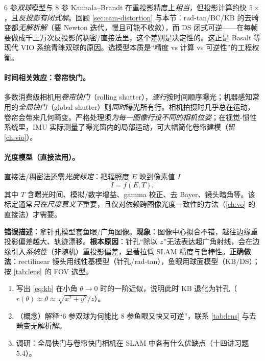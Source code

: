 \begin{insight}[现代实现为何偏爱双球]
$6$ 参\emph{双球}模型与 $8$ 参 Kannala--Brandt 在重投影精度上\emph{相当}，但投影计算约快 $5\times$，且\emph{反投影有闭式解}\cite{carlone2026handbook}。回顾 \cref{sec:cam-distortion} 与本节：rad-tan/BC/KB 的去畸变都\emph{无解析解}（要 Newton 迭代，慢且可能不收敛），而 DS 闭式可逆——在每帧要做成千上万次反投影的稠密/直接法里，这个差别是决定性的。这正是 Basalt 等现代 VIO 系统青睐双球的原因。选模型本质是“精度 vs 计算 vs 可逆性”的工程权衡。
\end{insight}

\paragraph{时间相关效应：卷帘快门。}
多数消费级相机用\emph{卷帘快门}（rolling shutter），\emph{逐行}按时间顺序曝光\cite{carlone2026handbook}；机器感知常用的\emph{全局快门}（global shutter）则\emph{同时}曝光所有行。相机拍摄时几乎总在运动，卷帘会带来几何畸变。严格处理须\emph{为每一图像行设不同的相机位姿}；在视觉-惯性系统里，IMU 实际测量了曝光窗内的局部运动，可大幅简化卷帘建模（留 \cref{ch:vio}）。

\paragraph{光度模型（直接法用）。}
直接法/稠密法还需\emph{光度标定}\cite{carlone2026handbook}：把辐照度 $E$ 映到像素值 $I$
\begin{equation}
  I=f(E,T),
  \label{eq:photometric}
\end{equation}
其中 $T$ 含曝光时间、模拟/数字增益、gamma 校正、去 Bayer、镜头暗角等。该标定通常\emph{只在尺度意义下}重要，且仅对依赖跨图像光度一致性的方法（\cref{ch:vo} 的直接法）才需要。

\begin{pitfall}[用错相机模型 $=$ 系统性偏差]
\textbf{错误描述}：拿针孔模型套鱼眼/广角图像。\textbf{现象}：图像中心拟合不错，越往边缘重投影偏差越大、轨迹漂移。\textbf{根本原因}：针孔“除以 $z$”无法表达超广角射线，会在边缘引入\emph{系统性}（非随机）重投影偏差，显著拉低 SLAM 精度与鲁棒性\cite{carlone2026handbook}。\textbf{正确做法}：rectilinear 镜头用线性基模型（针孔/rad-tan），鱼眼用球面模型（KB/DS）；按 \cref{tab:lens} 的 FOV 选型。
\end{pitfall}

\begin{practice}
\begin{enumerate}
  \item 写出 \cref{eq:kb} 在小角 $\theta\to0$ 时的一阶近似，说明此时 KB 退化为针孔（$r(\theta)\approx\theta\approx\sqrt{x^2+y^2}/z$）。
  \item （概念）解释“$6$ 参双球为何能比 $8$ 参鱼眼又快又可逆”，联系 \cref{tab:lens} 与去畸变无解析解。
  \item 调研：全局快门与卷帘快门相机在 SLAM 中各有什么优缺点（十四讲习题 5.4\cite{gaoxiang2019slam14}）。
\end{enumerate}
\end{practice}


